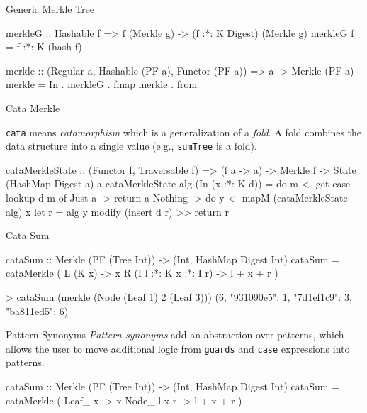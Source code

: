 \begin{slide}{Generic Merkle Tree}
\begin{haskell}
merkleG :: Hashable f => f (Merkle g) -> (f :*: K Digest) (Merkle g)
merkleG f = f :*: K (hash f)

merkle :: (Regular a, Hashable (PF a), Functor (PF a))
       => a -> Merkle (PF a)
merkle = In . merkleG . fmap merkle . from
\end{haskell}
\end{slide}

\begin{slide}{Cata Merkle}

\texttt{cata} means \textit{catamorphism} which is a generalization of a \textit{fold}. A fold combines the data structure into a single value (e.g., \texttt{sumTree} is a fold).  

\vspace*{0.4cm}
\begin{haskell}
cataMerkleState :: (Functor f, Traversable f)
                => (f a -> a) -> Merkle f -> State (HashMap Digest a) a
cataMerkleState alg (In (x :*: K d)) 
  = do m <- get
       case lookup d m of
         Just a  -> return a
         Nothing -> do y <- mapM (cataMerkleState alg) x
                       let r = alg y
                       modify (insert d r) >> return r
\end{haskell}
\end{slide}

\begin{slide}{Cata Sum}
\begin{haskell}
cataSum :: Merkle (PF (Tree Int)) -> (Int, HashMap Digest Int)
cataSum = cataMerkle
  (\case
    L (K x)                 -> x
    R (I l :*: K x :*: I r) -> l + x + r
  )

> cataSum (merkle (Node (Leaf 1) 2 (Leaf 3)))
    (6, {"931090e5": 1, "7d1ef1c9": 3, "ba811ed5": 6})
\end{haskell}
\end{slide}

\begin{slide}{Pattern Synonyms}
\textit{Pattern synonyms} add an abstraction over patterns, which allows the user to move additional logic from \texttt{guards} and \texttt{case} expressions into patterns.

\vspace*{0.4cm}
\begin{haskell}
cataSum :: Merkle (PF (Tree Int)) -> (Int, HashMap Digest Int)
cataSum = cataMerkle
  (\case
    Leaf_ x     -> x
    Node_ l x r -> l + x + r
  )
\end{haskell}
\end{slide}